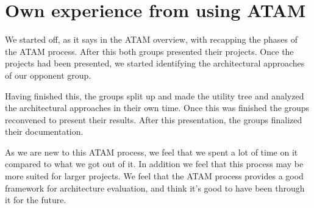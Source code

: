 \section{Own experience from using ATAM}
We started off, as it says in the ATAM overview, with recapping the phases of
the ATAM process. After this both groups presented their projects. Once the
projects had been presented, we started identifying the architectural
approaches of our opponent group.

Having finished this, the groups split up and made the utility tree and
analyzed the architectural approaches in their own time. Once this was finished
the groups reconvened to present their results. After this presentation, the
groups finalized their documentation.

As we are new to this ATAM process, we feel that we spent a lot of time on it
compared to what we got out of it. In addition we feel that this process may
be more suited for larger projects. We feel that the ATAM process provides a
good framework for architecture evaluation, and think it's good to have been
through it for the future.
